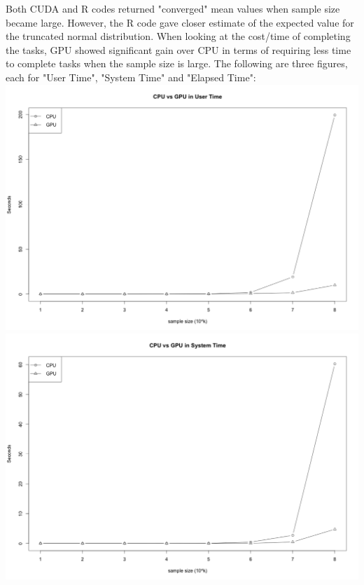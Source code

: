 \documentclass[12pt]{article}
\begin{document}
Both CUDA and R codes returned "converged" mean values when sample size became large. However, the R code gave closer estimate of the expected value for the truncated normal distribution. \newline
When looking at the cost/time of completing the tasks, GPU showed significant gain over CPU in terms of requiring less time to complete tasks when the sample size is large. The following are three figures, each for "User Time", "System Time" and "Elapsed Time":\newline
\includegraphics[width=\textwidth]{cpuvsgpuut.png}\newline
\includegraphics[width=\textwidth]{cpuvsgpust.png}\newline
\end{document}
